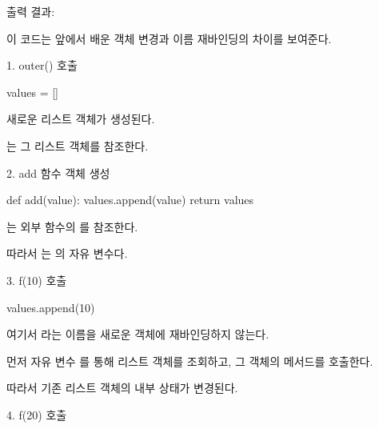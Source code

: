 출력 결과:

\begin{dhkzsh}
[10]
[10, 20]
[10, 20, 30]
\end{dhkzsh}

이 코드는 앞에서 배운 객체 변경과 이름 재바인딩의 차이를 보여준다.

\begin{dhknote}
\begin{dhksmry}[centered]
1. outer() 호출
\end{dhksmry}
\end{dhknote}

\begin{dhkcode}
values = []
\end{dhkcode}

새로운 리스트 객체가 생성된다.

는 그 리스트 객체를 참조한다.

\begin{dhknote}
\begin{dhksmry}[centered]
2. add 함수 객체 생성
\end{dhksmry}
\end{dhknote}

\begin{dhkcode}
def add(value):
    values.append(value)
    return values
\end{dhkcode}

는 외부 함수의 를 참조한다.

따라서 는 의 자유 변수다.

\begin{dhknote}
\begin{dhksmry}[centered]
3. f(10) 호출
\end{dhksmry}
\end{dhknote}

\begin{dhkcode}
values.append(10)
\end{dhkcode}

여기서 라는 이름을 새로운 객체에 재바인딩하지 않는다.

먼저 자유 변수 를 통해 리스트 객체를 조회하고, 그 객체의  메서드를 호출한다.

따라서 기존 리스트 객체의 내부 상태가 변경된다.

\begin{dhknote}
\begin{dhksmry}[centered]
4. f(20) 호출
\end{dhksmry}
\end{dhknote}

